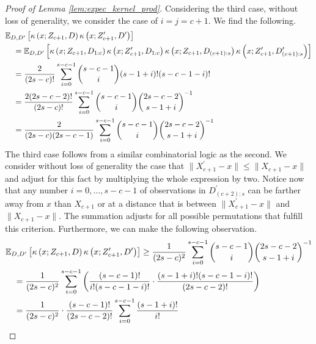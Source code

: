\begin{proof}[Proof of Lemma \ref{lem:expec_kernel_prod}]
    Considering the third case, without loss of generality, we consider the case of $i = j = c+1$.
    We find the following.
    \begin{equation}
        \begin{aligned}
            & \mathbb{E}_{D, D^{\prime}}\left[\kappa\left(x; Z_{c+1}, D\right)\kappa\left(x; Z_{c+1}^{\prime}, D^{\prime}\right)\right]\\
            & \quad  = \mathbb{E}_{D, D^{\prime}}\left[
                \kappa\left(x; Z_{c+1}, D_{1:c}\right)\kappa\left(x; Z_{c+1}^{\prime}, D_{1:c}\right)
                \kappa\left(x; Z_{c+1}, D_{(c+1):s}\right)\kappa\left(x; Z_{c+1}^{\prime}, D_{(c+1):s}^{\prime}\right)
            \right]\\
            & \quad = \frac{2}{(2s - c)!} \sum_{i = 0}^{s-c-1} \binom{s - c - 1}{i}(s - 1 + i)!(s-c-1-i)! \\
            & \quad = \frac{2(2s - c - 2)!}{(2s-c)!} \sum_{i = 0}^{s-c-1} \binom{s - c - 1}{i}\binom{2s - c - 2}{s-1+i}^{-1} \\
            & \quad = \frac{2}{(2s-c)(2s-c-1)}\sum_{i = 0}^{s-c-1} \binom{s - c - 1}{i}\binom{2s - c - 2}{s-1+i}^{-1}
        \end{aligned}
    \end{equation}
    The third case follows from a similar combinatorial logic as the second.
    We consider without loss of generality the case that $\|X_{c+1}^{\prime} - x\| \leq \|X_{c+1}-x\|$ and adjust for this fact by multiplying the whole expression by two.
    Notice now that any number $i = 0, \dotsc, s-c-1$ of observations in $D^{\prime}_{(c+2):s}$ can be farther away from $x$ than $X_{c+1}$ or at a distance that is between $\|X_{c+1}^{\prime} - x\|$ and $\|X_{c+1}-x\|$.
    The summation adjusts for all possible permutations that fulfill this criterion.
    Furthermore, we can make the following observation.
    \begin{equation}
        \begin{aligned}
            & \E_{D, D^{\prime}}\left[\kappa\left(x; Z_{c+1}, D\right)\kappa\left(x; Z_{c+1}^{\prime}, D^{\prime}\right)\right]
            \geq \frac{1}{(2s-c)^{2}}\sum_{i = 0}^{s-c-1} \binom{s - c - 1}{i}\binom{2s - c - 2}{s-1+i}^{-1} \\
            & \quad = \frac{1}{(2s-c)^{2}}\sum_{i = 0}^{s-c-1} \left(\frac{(s-c-1)!}{i!(s-c-1-i)!} \cdot \frac{(s-1+i)!(s-c-1-i)!}{(2s-c-2)!}\right)\\
            & \quad = \frac{1}{(2s-c)^{2}} \cdot \frac{(s-c-1)!}{(2s-c-2)!}\sum_{i = 0}^{s-c-1} \frac{(s-1+i)!}{i!}\\

\end{aligned}
\end{equation}
\end{proof}
